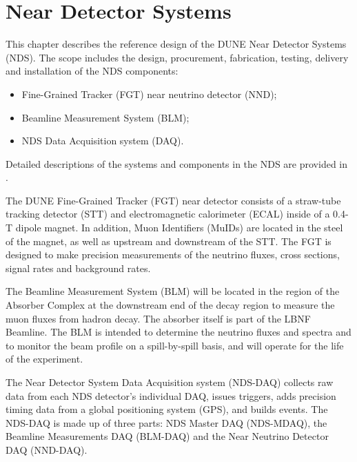 \section{Near Detector Systems}
\label{sec:detectors-nd-ref-ov}

This chapter describes the reference design of the DUNE Near Detector Systems (NDS). The scope includes the design, procurement, fabrication, testing, delivery and installation of the NDS components: 

\begin{itemize}
\item Fine-Grained Tracker (FGT) near neutrino detector (NND);
\item Beamline Measurement System (BLM);  
\item NDS Data Acquisition system (DAQ).  
\end{itemize}
Detailed descriptions of the systems and components in the NDS are provided in \anxndref. 

The DUNE Fine-Grained Tracker (FGT) near detector consists of a straw-tube
tracking detector (STT) and electromagnetic calorimeter (ECAL) inside of a 0.4-T
dipole magnet. In addition, Muon Identifiers (MuIDs) are located in the
steel of the magnet, as well as upstream and downstream of the STT. The FGT
is designed to make precision measurements of the neutrino fluxes, 
cross sections, signal rates and background rates. 

The Beamline Measurement System (BLM) will be located in the region of the Absorber Complex at 
the downstream end of the decay region to measure the muon fluxes from hadron decay. The 
absorber itself is part of the LBNF Beamline. 
The BLM is intended to determine the neutrino fluxes and spectra
and to monitor the beam profile on a spill-by-spill basis, and will operate for the life of the
experiment. 

The Near Detector System Data Acquisition system (NDS-DAQ) collects raw data from each NDS detector's
individual DAQ, issues triggers, adds precision timing 
data from a global positioning system (GPS), and builds events. 
The NDS-DAQ is made up of three parts: NDS Master DAQ (NDS-MDAQ), the Beamline Measurements 
DAQ (BLM-DAQ) and the Near Neutrino Detector DAQ (NND-DAQ).





